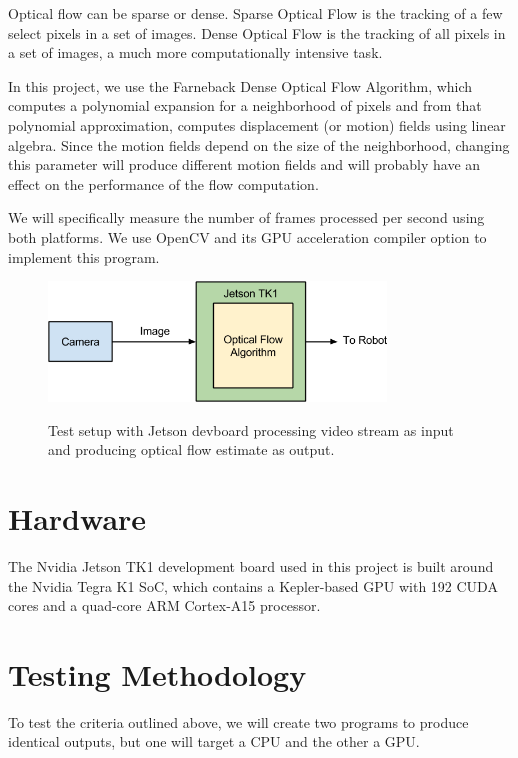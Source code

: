 \documentclass[12pt,letterpaper]{article}
\begin{document}
Optical flow can be sparse or dense. Sparse Optical Flow is the tracking of
a few select pixels in a set of images. Dense Optical Flow is the tracking of
all pixels in a set of images, a much more computationally intensive task.

In this project, we use the Farneback Dense Optical Flow Algorithm, which
computes a polynomial expansion for a neighborhood of pixels and from that
polynomial approximation, computes displacement (or motion) fields using linear
algebra. Since the motion fields depend on the size of the neighborhood,
changing this parameter will produce different motion fields and will probably
have an effect on the performance of the flow computation.

We will specifically measure the number of frames processed per second using
both platforms. We use OpenCV and its GPU acceleration compiler option to 
implement this program.

\begin{figure}[H]
  \centering
  \includegraphics[width=0.8\textwidth]{img/sys.png}
  \label{fig:sys}
  \caption{Test setup with Jetson devboard processing video stream as input and producing optical flow estimate as output.}
\end{figure}

\section{Hardware}
The Nvidia Jetson TK1 development board used in this project is built around
the Nvidia Tegra K1 SoC, which contains a Kepler-based GPU with 192 CUDA cores
and a quad-core ARM Cortex-A15 processor.

\section{Testing Methodology}
To test the criteria outlined above, we will create two programs to produce
identical outputs, but one will target a CPU and the other a GPU.
\end{document}
